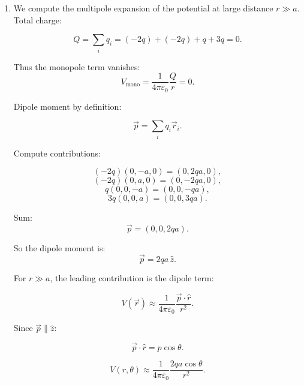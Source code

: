 \documentclass[12pt]{article}
\begin{document}
\begin{enumerate}
\[
\oint \vec{E}\cdot d\vec{A} = E(2\pi r L) = \frac{\lambda L}{\varepsilon_0}.
\]

Thus,
\[
E(r) = \frac{\lambda}{2\pi \varepsilon_0 r}.
\]

The potential difference between the cylinders is:

\[
V = V(a) - V(b) = -\int_a^b \vec{E}\cdot d\vec{r}.
\]

Since $\vec{E}$ is radial:

\[
V = -\int_a^b \frac{\lambda}{2\pi \varepsilon_0 r} \, dr = -\frac{\lambda}{2\pi \varepsilon_0} \int_a^b \frac{1}{r} dr
= -\frac{\lambda}{2\pi \varepsilon_0} \left[\ln r\right]_a^b = -\frac{\lambda}{2\pi \varepsilon_0} \ln\left(\frac{b}{a}\right).
\]

Taking magnitude:

\[
V = \frac{\lambda}{2\pi \varepsilon_0} \ln\left(\frac{b}{a}\right).
\]

By definition:

\[
C' = \frac{\lambda}{V} = \frac{\lambda}{\frac{\lambda}{2\pi \varepsilon_0} \ln(b/a)} = \frac{2\pi \varepsilon_0}{\ln(b/a)}.
\]

\item We compute the multipole expansion of the potential at large distance $r \gg a$. Total charge:

\[
Q = \sum_i q_i = (-2q) + (-2q) + q + 3q = 0.
\]

Thus the monopole term vanishes:
\[
V_{\text{mono}} = \frac{1}{4\pi\varepsilon_0}\frac{Q}{r} = 0.
\]
 
Dipole moment by definition:

\[
\vec{p} = \sum_i q_i \vec{r}_i.
\]

Compute contributions:

\[
(-2q)(0,-a,0) = (0,2qa,0),
\]
\[
(-2q)(0,a,0) = (0,-2qa,0),
\]
\[
q(0,0,-a) = (0,0,-qa),
\]
\[
3q(0,0,a) = (0,0,3qa).
\]

Sum:
\[
\vec{p} = (0,0,2qa).
\]

So the dipole moment is:
\[
\vec{p} = 2qa\,\hat{z}.
\]

For $r \gg a$, the leading contribution is the dipole term:

\[
V(\vec{r}) \approx \frac{1}{4\pi\varepsilon_0} \frac{\vec{p}\cdot \hat{r}}{r^2}.
\]

Since $\vec{p} \parallel \hat{z}$:

\[
\vec{p}\cdot \hat{r} = p \cos\theta.
\]

\[
V(r,\theta) \approx \frac{1}{4\pi\varepsilon_0} \frac{2qa \cos\theta}{r^2}.
\]



\end{enumerate}
\end{document}
